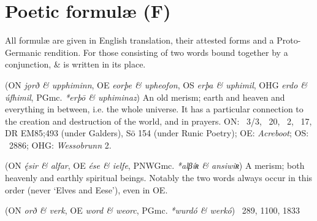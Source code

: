 \section{Poetic formulæ (F)}
All formulæ are given in English translation, their attested forms and a Proto-Germanic rendition. For those consisting of two words bound together by a conjunction, \& is written in its place.

\begin{itemize}
 (ON \emph{jǫrð \& upphiminn}, OE \emph{eorþe \& upheofon}, OS \emph{erþa \& uphimil}, OHG \emph{erdo \& úfhimil}, PGmc. \emph{*erþō \& uphiminaz})
  An old merism; earth and heaven and everything in between, i.e. the whole universe. It has a particular connection to the creation and destruction of the world, and in prayers.
  ON: \Voluspa\ 3/3, \Vafthrudnismal\ 20, \Thrymskvida\ 2, \Oddrunargratr\ 17, DR EM85;493 (under Galders), Sö 154 (under Runic Poetry);
  OE: \emph{Acreboot};
  OS: \Heliand\ 2886;
  OHG: \emph{Wessobrunn} 2.

 (ON \emph{ę́sir \& alfar}, OE \emph{ése \& ielfe}, PNWGmc. \emph{*alβíʀ \& ansiwiʀ})
  A merism; both heavenly and earthly spiritual beings.  Notably the two words always occur in this order (never ‘Elves and Eese’), even in OE.

 (ON \emph{orð \& verk}, OE \emph{word \& weorc}, PGmc. \emph{*wurdó \& werkó})
  \Beowulf\ 289, 1100, 1833

\end{itemize}
